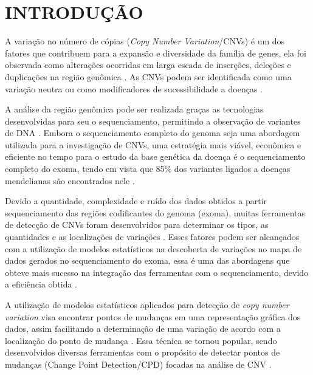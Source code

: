 
\chapter{INTRODUÇÃO}
\label{chap:introducao}

A variação no número de cópias (\textit{Copy Number Variation}/CNVs) é um dos fatores que contribuem para a expansão e diversidade da família de genes, ela foi observada como alterações ocorridas em larga escada de inserções, deleções e duplicações na região genômica \cite{Perry2009,Zhao2013,Redon2006,Costain2016}. 
As CNVs podem ser identificada como uma variação neutra ou como modificadores de sucessibilidade a doenças \cite{Costain2016,Perry2009}.

A análise da região genômica pode ser realizada graças as tecnologias desenvolvidas para seu o sequenciamento, permitindo a observação de variantes de DNA \cite{Sathirapongsasuti2011}. Embora o sequenciamento completo do genoma seja uma abordagem utilizada para a investigação de CNVs, uma estratégia mais viável, econômica e eficiente no tempo para o estudo da base genética da doença é o sequenciamento completo do exoma, tendo em vista que 85\% dos variantes ligados a doenças mendelianas são encontrados nele \cite{Chong2015,Sathirapongsasuti2011,Fromer2012}.

Devido a quantidade, complexidade e ruído dos dados obtidos a partir sequenciamento das regiões codificantes do genoma (exoma), muitas ferramentas de detecção de CNVs foram desenvolvidos para determinar os tipos, as quantidades e as localizações de variações \cite{Fromer2012,Tan2014}. Esses fatores podem ser alcançados com a utilização de modelos estatísticos na descoberta de variações no mapa de dados gerados no sequenciamento do exoma, essa é uma das abordagens que obteve mais sucesso na integração das ferramentas com o sequenciamento, devido a eficiência obtida \cite{Tan2014}. 

A utilização de modelos estatísticos aplicados para detecção de \textit{copy number variation} visa encontrar pontos de mudanças em uma representação gráfica dos dados, assim facilitando a determinação de uma variação de acordo com a localização do ponto de mudança \cite{Zhao2013}. Essa técnica se tornou popular, sendo desenvolvidos diversas ferramentas com o propósito de detectar pontos de mudanças (Change Point Detection/CPD) focadas na análise de CNV \cite{Olshen2004,Baldi2001,Girimurugan2018,Picard2011,Plagnol2012,Muggeo2010}. 

